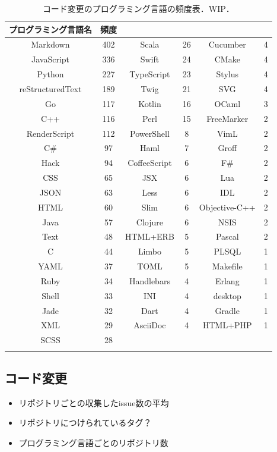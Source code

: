 \begin{table}[t]
\small
  \centering
  \caption{コード変更のプログラミング言語の頻度表．WIP．}
  \label{table:issue_lang_freq}
  \begin{tabular}{ c | c || c | c || c | c } \Xhline{3\arrayrulewidth}
プログラミング言語名 & 頻度 &  &  &  &  \\ \hline \hline
Markdown & 402 & Scala & 26 & Cucumber & 4 \\
JavaScript & 336 & Swift & 24 & CMake & 4 \\
Python & 227 & TypeScript & 23 & Stylus & 4 \\
reStructuredText & 189 & Twig & 21 & SVG & 4 \\
Go & 117 & Kotlin & 16 & OCaml & 3 \\
C++ & 116 & Perl & 15 & FreeMarker & 2 \\
RenderScript & 112 & PowerShell & 8 & VimL & 2 \\
C\# & 97 & Haml & 7 & Groff & 2 \\
Hack & 94 & CoffeeScript & 6 & F\# & 2 \\
CSS & 65 & JSX & 6 & Lua & 2 \\
JSON & 63 & Less & 6 & IDL & 2 \\
HTML & 60 & Slim & 6 & Objective-C++ & 2 \\
Java & 57 & Clojure & 6 & NSIS & 2 \\
Text & 48 & HTML+ERB & 5 & Pascal & 2 \\
C & 44 & Limbo & 5 & PLSQL & 1 \\
YAML & 37 & TOML & 5 & Makefile & 1 \\
Ruby & 34 & Handlebars & 4 & Erlang & 1 \\
Shell & 33 & INI & 4 & desktop & 1 \\
Jade & 32 & Dart & 4 & Gradle & 1 \\
XML & 29 & AsciiDoc & 4 & HTML+PHP & 1 \\
SCSS & 28 & & & & \\

\Xhline{3\arrayrulewidth}
\end{tabular}
\end{table}




\subsection{コード変更}

\begin{itemize}
    \item リポジトリごとの収集したissue数の平均
    \item リポジトリにつけられているタグ？
    \item プログラミング言語ごとのリポジトリ数
\end{itemize}